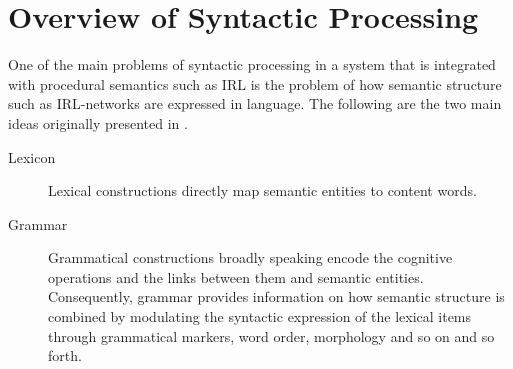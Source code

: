 \section{Overview of Syntactic Processing}
\label{s:syntactic-processing-overview}
One of the main problems of syntactic processing in a system that
is integrated with procedural semantics such as IRL is the problem
of how semantic structure such as IRL-networks are expressed
in language. The following are the two main ideas originally presented
in \citep{steels2005planning}.
\begin{description}
\item[Lexicon] Lexical constructions directly map semantic entities 
to content words.
\item[Grammar] Grammatical constructions broadly speaking encode
the cognitive operations and the links between them and 
semantic entities. Consequently, grammar 
provides information on how semantic structure is combined \cite{steels2011phrasal}
by modulating the syntactic expression of the lexical items through
grammatical markers, word order, morphology and so on and so forth. 
\end{description}

